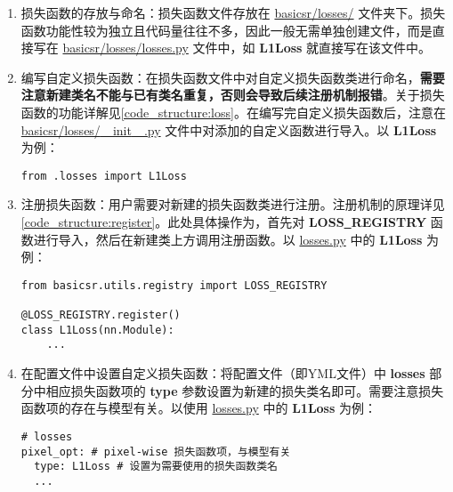 \documentclass[../main.tex]{subfiles}
\begin{document}
\begin{enumerate}
	\item 损失函数的存放与命名：损失函数文件存放在 \href{https://github.com/XPixelGroup/BasicSR/tree/master/basicsr/losses}{basicsr/losses/} 文件夹下。损失函数功能性较为独立且代码量往往不多，因此一般无需单独创建文件，而是直接写在 \href{https://github.com/XPixelGroup/BasicSR/tree/master/basicsr/losses/losses.py}{basicsr/losses/losses.py} 文件中，如 \textbf{L1Loss} 就直接写在该文件中。
	
	\item 编写自定义损失函数：在损失函数文件中对自定义损失函数类进行命名，\textbf{需要注意新建类名不能与已有类名重复，否则会导致后续注册机制报错}。关于损失函数的功能详解见\ref{code_structure:loss}。在编写完自定义损失函数后，注意在 \href{https://github.com/XPixelGroup/BasicSR/tree/master/basicsr/losses/__init__.py}{basicsr/losses/\underline{~~}init\underline{~~}.py} 文件中对添加的自定义函数进行导入。以 \textbf{L1Loss} 为例：
\begin{verbatim}
from .losses import L1Loss
\end{verbatim}
	
	\item 注册损失函数：用户需要对新建的损失函数类进行注册。注册机制的原理详见\ref{code_structure:register}。此处具体操作为，首先对 \textbf{LOSS\underline{~}REGISTRY} 函数进行导入，然后在新建类上方调用注册函数。以 \href{https://github.com/XPixelGroup/BasicSR/tree/master/basicsr/losses/losses.py}{losses.py} 中的 \textbf{L1Loss} 为例：
\begin{verbatim}
from basicsr.utils.registry import LOSS_REGISTRY

@LOSS_REGISTRY.register()
class L1Loss(nn.Module):
    ...
\end{verbatim}
	
	\item 在配置文件中设置自定义损失函数：将配置文件（即YML文件）中 \textbf{losses} 部分中相应损失函数项的 \textbf{type} 参数设置为新建的损失类名即可。需要注意损失函数项的存在与模型有关。以使用 \href{https://github.com/XPixelGroup/BasicSR/tree/master/basicsr/losses/losses.py}{losses.py} 中的 \textbf{L1Loss} 为例：
\begin{verbatim}
# losses
pixel_opt: # pixel-wise 损失函数项，与模型有关
  type: L1Loss # 设置为需要使用的损失函数类名
  ...
\end{verbatim}
\end{enumerate}
\end{document}
